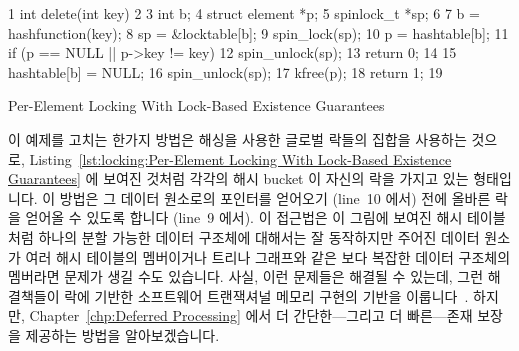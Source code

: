 \begin{listing}[tbp]
{ \scriptsize
\begin{verbbox}
  1 int delete(int key)
  2 {
  3   int b;
  4   struct element *p;
  5   spinlock_t *sp;
  6
  7   b = hashfunction(key);
  8   sp = &locktable[b];
  9   spin_lock(sp);
 10   p = hashtable[b];
 11   if (p == NULL || p->key != key) {
 12     spin_unlock(sp);
 13     return 0;
 14   }
 15   hashtable[b] = NULL;
 16   spin_unlock(sp);
 17   kfree(p);
 18   return 1;
 19 }
\end{verbbox}
}
\centering
\theverbbox
\caption{Per-Element Locking With Lock-Based Existence Guarantees}
\label{lst:locking:Per-Element Locking With Lock-Based Existence Guarantees}
\end{listing}

이 예제를 고치는 한가지 방법은 해싱을 사용한 글로벌 락들의 집합을 사용하는
것으로,
Listing~\ref{lst:locking:Per-Element Locking With Lock-Based Existence Guarantees}
에 보여진 것처럼 각각의 해시 bucket 이 자신의 락을 가지고 있는 형태입니다.
이 방법은 그 데이터 원소로의 포인터를 얻어오기 (line~10 에서) 전에 올바른 락을
얻어올 수 있도록 합니다 (line~9 에서).
이 접근법은 이 그림에 보여진 해시 테이블처럼 하나의 분할 가능한 데이터 구조체에
대해서는 잘 동작하지만 주어진 데이터 원소가 여러 해시 테이블의 멤버이거나
트리나 그래프와 같은 보다 복잡한 데이터 구조체의 멤버라면 문제가 생길 수도
있습니다.
사실, 이런 문제들은 해결될 수 있는데, 그런 해결책들이 락에 기반한 소프트웨어
트랜잭셔널 메모리 구현의 기반을 이룹니다~\cite{Shavit95,DaveDice2006DISC}.
하지만, Chapter~\ref{chp:Deferred Processing} 에서 더 간단한---그리고 더
빠른---존재 보장을 제공하는 방법을 알아보겠습니다.
\iffalse

One way to fix this example is to use a hashed set of global locks, so
that each hash bucket has its own lock, as shown in
Listing~\ref{lst:locking:Per-Element Locking With Lock-Based Existence Guarantees}.
This approach allows acquiring the proper lock (on line~9) before
gaining a pointer to the data element (on line~10).
Although this approach works quite well for elements contained in a
single partitionable data structure such as the hash table shown in the
figure, it can be problematic if a given data element can be a member
of multiple hash tables or given more-complex data structures such
as trees or graphs.
Not only can these problems be solved, but the solutions also form
the basis of lock-based software transactional memory
implementations~\cite{Shavit95,DaveDice2006DISC}.
However,
Chapter~\ref{chp:Deferred Processing}
describes simpler---and faster---ways of providing existence guarantees.
\fi
